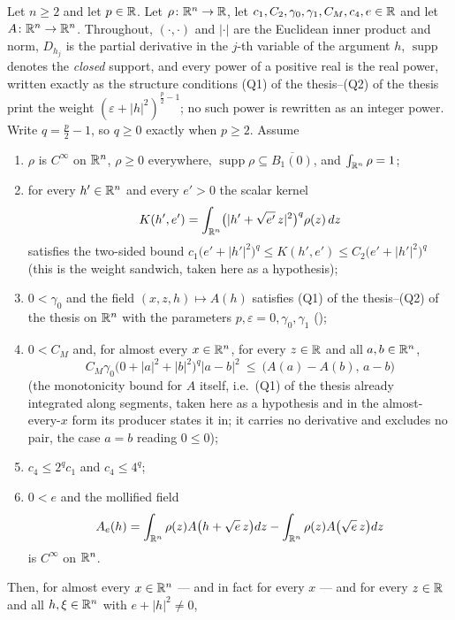 \begin{helper}
Let $n\ge2$ and let $p\in\mathbb{R}$.  Let $\rho\colon\mathbb{R}^n\to\mathbb{R}$, let
$c_1,C_2,\gamma_0,\gamma_1,C_M,c_4,e\in\mathbb{R}$ and let $A\colon\mathbb{R}^n\to\mathbb{R}^n$.
Throughout, $(\cdot,\cdot)$ and $|\cdot|$ are the Euclidean inner product and
norm, $D_{h_j}$ is the partial derivative in the $j$-th variable of the argument
$h$, $\operatorname{supp}$ denotes the \emph{closed} support, and every power of
a positive real is the real power, written exactly as the structure conditions
(Q1) of the thesis--(Q2) of the thesis print the weight
$(\varepsilon+|h|^2)^{\frac p2-1}$; no such power is rewritten as an integer
power.  Write $q=\tfrac p2-1$, so $q\ge0$ exactly when $p\ge2$.  Assume
\begin{enumerate}
\item[(H1)] $\rho$ is $C^\infty$ on $\mathbb{R}^n$, $\rho\ge0$ everywhere,
  $\operatorname{supp}\rho\subseteq\overline{B_1(0)}$, and
  $\int_{\mathbb{R}^n}\rho=1$;
\item[(H2)] for every $h'\in\mathbb{R}^n$ and every $e'>0$ the scalar kernel
  \[
  K(h',e')=\int_{\mathbb{R}^n}\bigl(|h'+\sqrt{e'}\,z|^2\bigr)^{q}\rho(z)\,dz
  \]
  satisfies the two-sided bound
  $c_1\bigl(e'+|h'|^2\bigr)^{q}\le K(h',e')\le C_2\bigl(e'+|h'|^2\bigr)^{q}$
  (this is the weight sandwich, taken here as a hypothesis);
\item[(H3)] $0<\gamma_0$ and the field $(x,z,h)\mapsto A(h)$ satisfies
  (Q1) of the thesis--(Q2) of the thesis on $\mathbb{R}^n$ with the parameters
  $p,\varepsilon=0,\gamma_0,\gamma_1$ ();
\item[(H4)] $0<C_M$ and, for almost every $x\in\mathbb{R}^n$, for every $z\in\mathbb{R}$ and all
  $a,b\in\mathbb{R}^n$,
  \[
  C_M\gamma_0\bigl(0+|a|^2+|b|^2\bigr)^{q}|a-b|^2
  \ \le\ \bigl(A(a)-A(b),\,a-b\bigr)
  \tag{MA}
  \]
  (the monotonicity bound for $A$ itself, i.e.\ (Q1) of the thesis already integrated
  along segments, taken here as a hypothesis and in the almost-every-$x$ form
  its producer states it in; it carries no derivative and excludes no pair, the
  case $a=b$ reading $0\le0$);
\item[(H5)] $c_4\le2^{q}c_1$ and $c_4\le4^{q}$;
\item[(H6)] $0<e$ and the mollified field
  \[
  A_e(h)=\int_{\mathbb{R}^n}\rho(z)A\bigl(h+\sqrt e\,z\bigr)dz
    -\int_{\mathbb{R}^n}\rho(z)A\bigl(\sqrt e\,z\bigr)dz
  \]
  is $C^\infty$ on $\mathbb{R}^n$.
\end{enumerate}
Then, for almost every $x\in\mathbb{R}^n$ --- and in fact for every $x$ --- and for
every $z\in\mathbb{R}$ and all $h,\xi\in\mathbb{R}^n$ with $e+|h|^2\ne0$,

\end{helper}
